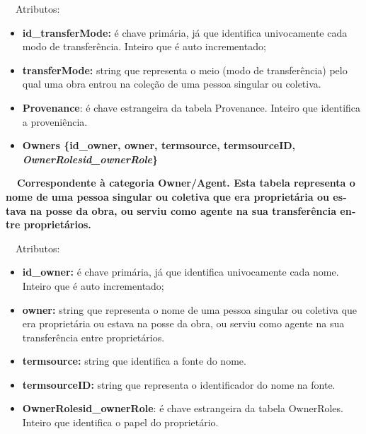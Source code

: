 \documentclass[letterpaper]{article}
\newcommand\textstyleStrongEmphasis[1]{\textbf{#1}}
\newcommand\liststyleLi{%
\renewcommand\labelitemi{{\textbullet}}
\renewcommand\labelitemii{[27A2?]}
\renewcommand\labelitemiii{{\textbullet}}
\renewcommand\labelitemiv{{\textbullet}}
}
\newcommand\liststyleLxiv{%
\renewcommand\labelitemi{[27A2?]}
\renewcommand\labelitemii{[27A2?]}
\renewcommand\labelitemiii{[27A2?]}
\renewcommand\labelitemiv{[27A2?]}
}
\begin{document}
\bigskip

{
\ \ Atributos:}

\liststyleLxiv
\begin{itemize}
\item {
\textbf{id\_transferMode: }\'e chave prim\'aria, j\'a que identifica
univocamente cada modo de transfer\^encia. Inteiro que \'e auto
incrementado;}
\item {
\textbf{transferMode: }string que representa o meio (modo de
transfer\^encia) pelo qual uma obra entrou na cole\c{c}\~ao de uma
pessoa singular ou coletiva.}
\item {
\textbf{Provenance}:\textit{ }\'e chave estrangeira da tabela
Provenance. Inteiro que identifica a proveni\^encia.}
\end{itemize}

\bigskip

\liststyleLi
\begin{itemize}
\item {\bfseries
Owners\textmd{ \{}\textmd{id\_owner}\textmd{, owner}\textmd{,
termsource, termsourceID,
}\textmd{\textit{OwnerRolesid\_ownerRole}}\textmd{\}}}
\end{itemize}
{\bfseries
\foreignlanguage{english}{\textmd{\ \ Correspondente \`a categoria
}}\foreignlanguage{english}{Owner}\textstyleStrongEmphasis{\foreignlanguage{english}{/Agent}}\foreignlanguage{english}{\textmd{.
Esta
}}\textstyleStrongEmphasis{\foreignlanguage{english}{\textmd{tabela}}}\foreignlanguage{english}{\textmd{
representa o nome de uma pessoa singular ou coletiva que era
propriet\'aria ou estava na posse da obra, ou serviu como agente na sua
transfer\^encia entre propriet\'arios.}}}


\bigskip

{
\ \ Atributos:}

\liststyleLxiv
\begin{itemize}
\item {
\textbf{id\_owner: }\'e chave prim\'aria, j\'a que identifica
univocamente cada nome. Inteiro que \'e auto incrementado;}
\item {
\textbf{owner: }string que representa o nome de uma pessoa singular ou
coletiva que era propriet\'aria ou estava na posse da obra, ou serviu
como agente na sua transfer\^encia entre propriet\'arios.}
\item {
\textbf{termsource: }string que identifica a fonte do nome.}
\item {
\textbf{termsourceID:} string que representa o identificador do nome na
fonte.}
\item {
\textbf{OwnerRolesid\_ownerRole}:\textit{ }\'e chave estrangeira da
tabela OwnerRoles. Inteiro que identifica o papel do propriet\'ario.}
\end{itemize}
\end{document}
